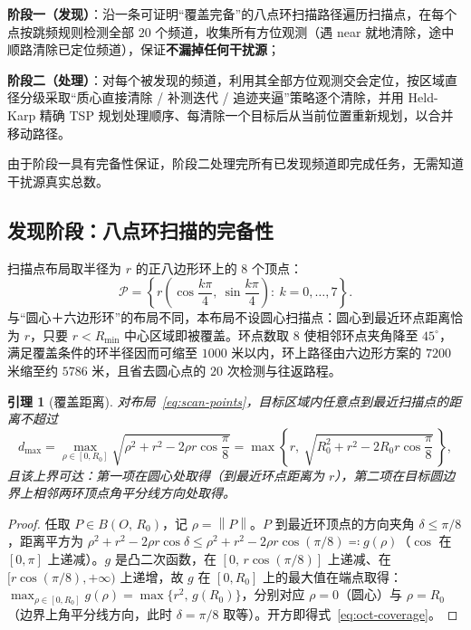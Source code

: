 \documentclass[12pt,a4paper]{ctexart}
\newtheorem{lemma}[theorem]{引理}
\numberwithin{figure}{section}
\numberwithin{table}{section}
\numberwithin{equation}{section}
\newcommand{\disk}[2]{B\!\left(#1,\,#2\right)}
\newcommand{\norm}[1]{\left\lVert #1\right\rVert}
\begin{document}
\textbf{阶段一（发现）}：沿一条可证明“覆盖完备”的八点环扫描路径遍历扫描点，在每个点按跳频规则检测全部 $20$ 个频道，收集所有方位观测（遇 near 就地清除，途中顺路清除已定位频道），保证\textbf{不漏掉任何干扰源}；

\textbf{阶段二（处理）}：对每个被发现的频道，利用其全部方位观测交会定位，按区域直径分级采取“质心直接清除 / 补测迭代 / 追迹夹逼”策略逐个清除，并用 Held-Karp 精确 TSP 规划处理顺序、每清除一个目标后从当前位置重新规划，以合并移动路径。

由于阶段一具有完备性保证，阶段二处理完所有已发现频道即完成任务，无需知道干扰源真实总数。

\subsection{发现阶段：八点环扫描的完备性}

扫描点布局取半径为 $r$ 的正八边形环上的 $8$ 个顶点：
\begin{equation}
\mathcal{P}=\left\{r\left(\cos\frac{k\pi}{4},\ \sin\frac{k\pi}{4}\right):\ k=0,\dots,7\right\}.
\label{eq:scan-points}
\end{equation}
与“圆心＋六边形环”的布局不同，本布局不设圆心扫描点：圆心到最近环点距离恰为 $r$，只要 $r<R_{\min}$ 中心区域即被覆盖。环点数取 $8$ 使相邻环点夹角降至 $45^{\circ}$，满足覆盖条件的环半径因而可缩至 $1000$ 米以内，环上路径由六边形方案的 $7200$ 米缩至约 $5786$ 米，且省去圆心点的 $20$ 次检测与往返路程。

\begin{lemma}[覆盖距离]
\label{lem:coverage}
对布局~\eqref{eq:scan-points}，目标区域内任意点到最近扫描点的距离不超过
\begin{equation}
d_{\max}=\max_{\rho\in[0,R_0]}\sqrt{\rho^{2}+r^{2}-2\rho r\cos\frac{\pi}{8}}
=\max\!\left\{r,\ \sqrt{R_0^{2}+r^{2}-2R_0r\cos\frac{\pi}{8}}\,\right\},
\label{eq:oct-coverage}
\end{equation}
且该上界可达：第一项在圆心处取得（到最近环点距离为 $r$），第二项在目标圆边界上相邻两环顶点角平分线方向处取得。
\end{lemma}

\begin{proof}
任取 $P\in\disk{O}{R_0}$，记 $\rho=\norm{P}$。$P$ 到最近环顶点的方向夹角 $\delta\le\pi/8$，距离平方为 $\rho^2+r^2-2\rho r\cos\delta\le\rho^2+r^2-2\rho r\cos(\pi/8)\eqqcolon g(\rho)$（$\cos$ 在 $[0,\pi]$ 上递减）。$g$ 是凸二次函数，在 $[0,\,r\cos(\pi/8)]$ 上递减、在 $[r\cos(\pi/8),+\infty)$ 上递增，故 $g$ 在 $[0,R_0]$ 上的最大值在端点取得：$\max_{\rho\in[0,R_0]}g(\rho)=\max\{r^{2},\,g(R_0)\}$，分别对应 $\rho=0$（圆心）与 $\rho=R_0$（边界上角平分线方向，此时 $\delta=\pi/8$ 取等）。开方即得式~\eqref{eq:oct-coverage}。
\end{proof}
\end{document}
